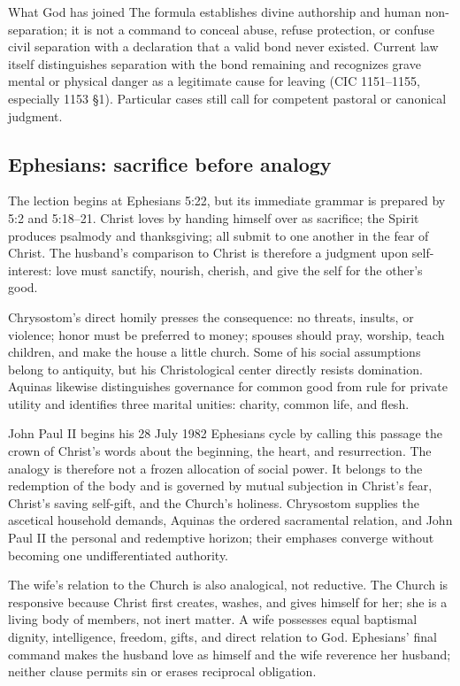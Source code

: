 \begin{studybox}{What God has joined}
The formula  establishes divine authorship and human non-separation; it is not a command to conceal abuse, refuse protection, or confuse civil separation with a declaration that a valid bond never existed. Current law itself distinguishes separation with the bond remaining and recognizes grave mental or physical danger as a legitimate cause for leaving (CIC 1151--1155, especially 1153 \S1). Particular cases still call for competent pastoral or canonical judgment.
\end{studybox}

\sectionguard
\subsection*{Ephesians: sacrifice before analogy\enspace{}}

The lection begins at Ephesians 5:22, but its immediate grammar is prepared by 5:2 and 5:18--21. Christ loves by handing himself over as sacrifice; the Spirit produces psalmody and thanksgiving; all submit to one another in the fear of Christ. The husband's comparison to Christ is therefore a judgment upon self-interest: love must sanctify, nourish, cherish, and give the self for the other's good.

Chrysostom's direct homily presses the consequence: no threats, insults, or violence; honor must be preferred to money; spouses should pray, worship, teach children, and make the house a little church. Some of his social assumptions belong to antiquity, but his Christological center directly resists domination. Aquinas likewise distinguishes governance for common good from rule for private utility and identifies three marital unities: charity, common life, and flesh.

John Paul II begins his 28 July 1982 Ephesians cycle by calling this passage the crown of Christ's words about the beginning, the heart, and resurrection. The analogy is therefore not a frozen allocation of social power. It belongs to the redemption of the body and is governed by mutual subjection in Christ's fear, Christ's saving self-gift, and the Church's holiness. Chrysostom supplies the ascetical household demands, Aquinas the ordered sacramental relation, and John Paul II the personal and redemptive horizon; their emphases converge without becoming one undifferentiated authority.

The wife's relation to the Church is also analogical, not reductive. The Church is responsive because Christ first creates, washes, and gives himself for her; she is a living body of members, not inert matter. A wife possesses equal baptismal dignity, intelligence, freedom, gifts, and direct relation to God. Ephesians' final command makes the husband love as himself and the wife reverence her husband; neither clause permits sin or erases reciprocal obligation.

